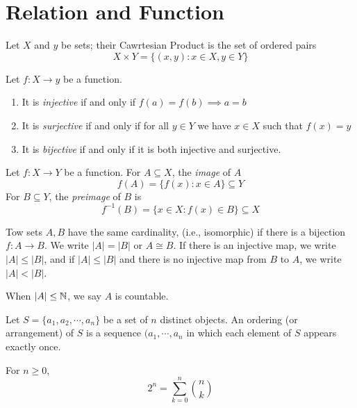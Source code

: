 \documentclass[12pt]{article}
\begin{document}
\section{Relation and Function}

\begin{definition}
	Let $X$ and $y$ be sets; their Cawrtesian Product is the set of ordered pairs 
	\[ 
		X\times Y = \{(x,y): x\in X, y\in Y\}
	\]
\end{definition}
\begin{definition}
	Let $f:X \rightarrow y$ be a function. 
	\begin{enumerate}
		\item		It is \emph{injective} if and only if $f(a)=f(b) \implies a=b$
		\item It is \emph{surjective} if and only if for all $y\in Y$ we have $x\in X$ such that $f(x)=y$	
		\item	It is \emph{bijective} if and only if it is both injective and surjective.
	\end{enumerate}
\end{definition}

\begin{definition}
	Let $f:X \rightarrow Y$ be a function. For $A \subseteq X$, the \emph{image} of $A$
	\[
		f(A) = \{f(x): x\in A\}\subseteq Y
	\]
	For $B \subseteq Y$, the \emph{preimage} of $B$ is 
	\[
		f^{-1}(B) = \{x\in X: f(x)\in B\}\subseteq X
	\]
\end{definition}

\begin{definition}[Cardinality]
	Tow sets $A, B$ have the same cardinality, (i.e., isomorphic) if there is a bijection $f:A \rightarrow B$. We write $|A|=|B|$ or $A \cong B$. If there is an injective map, we write $|A| \leq |B|$, and if $|A| \leq |B|$ and there is no injective map from $B$ to $A$, we write $|A| < |B|$.

	When $|A| \leq \mathbb{N}$, we say $A$ is countable.
\end{definition}

\begin{definition}
	Let $S=\{a_1, a_2, \cdots, a_n\}$ be a set of $n$ distinct objects. An ordering (or arrangement) of $S$ is a sequence $(a_1, \cdots, a_n$ in which each element of $S$ appears exactly once.
\end{definition}

\begin{theorem}
For $n\geq 0$, 
\[
	2^n = \sum_{k=0}^n \binom{n}{k}
\]
\end{theorem}
\end{document}
